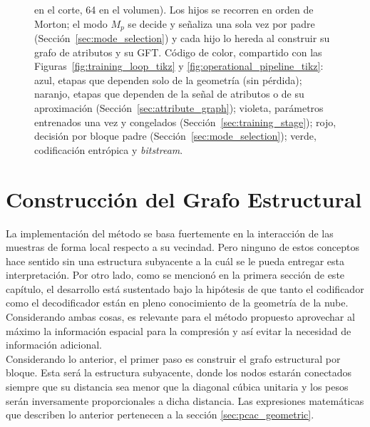\begin{figure}[H]
{        en el corte, 64 en el volumen). Los hijos se recorren en orden de Morton; el modo $M_p$
        se decide y señaliza una sola vez por padre (Sección~\ref{sec:mode_selection}) y cada
        hijo lo hereda al construir su grafo de atributos y su GFT. Código de color, compartido
        con las Figuras~\ref{fig:training_loop_tikz} y \ref{fig:operational_pipeline_tikz}: azul,
        etapas que dependen solo de la geometría (sin pérdida); naranjo, etapas que dependen de
        la señal de atributos o de su aproximación (Sección~\ref{sec:attribute_graph}); violeta,
        parámetros entrenados una vez y congelados (Sección~\ref{sec:training_stage}); rojo,
        decisión por bloque padre (Sección~\ref{sec:mode_selection}); verde, codificación
        entrópica y \textit{bitstream}.}
        \label{fig:hierarchy_tikz}
        \end{figure}


\section{Construcción del Grafo Estructural}\label{sec:structural_graph}
    La implementación del método se basa fuertemente en la interacción de las muestras de forma local respecto a su vecindad. Pero ninguno de estos conceptos hace sentido sin una estructura subyacente a la cuál se le pueda entregar esta interpretación. Por otro lado, como se mencionó en la primera sección de este capítulo, el desarrollo está sustentado bajo la hipótesis de que tanto el codificador como el decodificador están en pleno conocimiento de la geometría de la nube. Considerando ambas cosas, es relevante para el método propuesto aprovechar al máximo la información espacial para la compresión y así evitar la necesidad de información adicional.\\

    Considerando lo anterior, el primer paso es construir el grafo estructural por bloque. Esta será la estructura subyacente, donde los nodos estarán conectados siempre que su distancia sea menor que la diagonal cúbica unitaria y los pesos serán inversamente proporcionales a dicha distancia. Las expresiones matemáticas que describen lo anterior pertenecen a la sección \ref{sec:pcac_geometric}.\\

